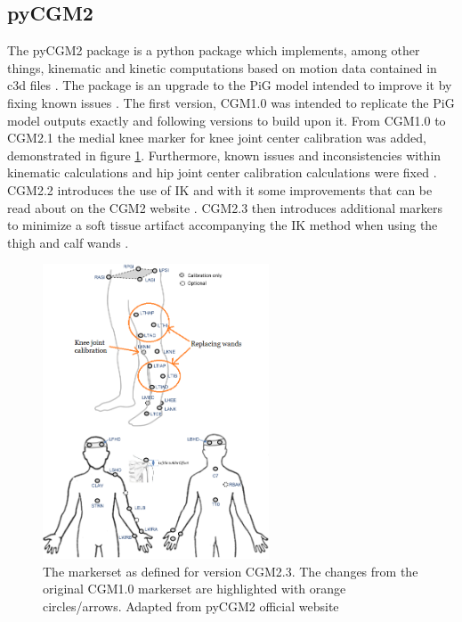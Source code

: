 \documentclass[../main.tex]{subfiles}
\begin{document}
\subsection{pyCGM2}
\label{sec:A-pyCGM2}
The pyCGM2 package is a python package which implements, among other things, kinematic and kinetic computations based on motion data contained in c3d files \cite{Leboeuf2019}.
The package is an upgrade to the \ac{PiG} model intended to improve it by fixing known issues \cite{Leboeuf2019}.
The first version, CGM1.0 was intended to replicate the \ac{PiG} model outputs exactly and following versions to build upon it.
From CGM1.0 to CGM2.1 the medial knee marker for knee joint center calibration was added, demonstrated in figure \ref{fig:cgm23-markerset-sota}.
Furthermore, known issues and inconsistencies within kinematic calculations and hip joint center calibration calculations were fixed \cite{Leboeuf2019}.
CGM2.2 introduces the use of \ac{IK} and with it some improvements that can be read about on the CGM2 website \cite{cgm22}. 
CGM2.3 then introduces additional markers to minimize a soft tissue artifact accompanying the \ac{IK} method when using the thigh and calf wands \cite{cgm23}.
\begin{figure}[!hbt]
    \centering
    \includegraphics[width=0.6\textwidth]{img/CGM23_markerset_highlight.png}
    \caption{The markerset as defined for version CGM2.3. The changes from the original CGM1.0 markerset are highlighted with orange circles/arrows. Adapted from pyCGM2 official website \cite{cgm23}}
    \label{fig:cgm23-markerset-sota}
\end{figure}
\end{document}
